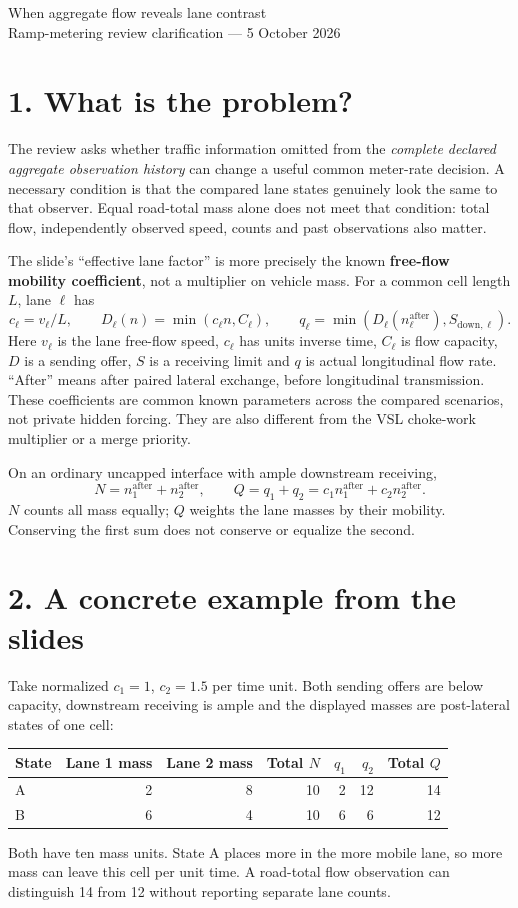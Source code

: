 \documentclass[11pt]{article}
\begin{document}
\begin{center}
{\Large When aggregate flow reveals lane contrast}\\[0.4em]
Ramp-metering review clarification --- 5 October 2026
\end{center}

\section*{1. What is the problem?}
The review asks whether traffic information omitted from the \emph{complete
declared aggregate observation history} can change a useful common meter-rate
decision. A necessary condition is that the compared lane states genuinely look
the same to that observer. Equal road-total mass alone does not meet that condition:
total flow, independently observed speed, counts and past observations also matter.

The slide's ``effective lane factor'' is more precisely the known
\textbf{free-flow mobility coefficient}, not a multiplier on vehicle mass.
For a common cell length \(L\), lane \(\ell\) has
\[
 c_\ell=v_\ell/L,\qquad
 D_\ell(n)=\min(c_\ell n,C_\ell),\qquad
 q_\ell=\min(D_\ell(n_\ell^{\mathrm{after}}),S_{\mathrm{down},\ell}).
\]
Here \(v_\ell\) is the lane free-flow speed, \(c_\ell\) has units inverse time,
\(C_\ell\) is flow capacity, \(D\) is a sending offer, \(S\) is a receiving
limit and \(q\) is actual longitudinal flow rate. ``After'' means after paired
lateral exchange, before longitudinal transmission. These coefficients are
common known parameters across the compared scenarios, not private hidden forcing.
They are also different from the VSL choke-work multiplier or a merge priority.

On an ordinary uncapped interface with ample downstream receiving,
\[
 N=n_1^{\mathrm{after}}+n_2^{\mathrm{after}},\qquad
 Q=q_1+q_2=c_1n_1^{\mathrm{after}}+c_2n_2^{\mathrm{after}}.
\]
\(N\) counts all mass equally; \(Q\) weights the lane masses by their mobility.
Conserving the first sum does not conserve or equalize the second.

\section*{2. A concrete example from the slides}
Take normalized \(c_1=1\), \(c_2=1.5\) per time unit. Both sending offers
are below capacity, downstream receiving is ample and the displayed masses
are post-lateral states of one cell:
\begin{center}
\begin{tabular}{@{}lrrrrrr@{}}
\toprule
State & Lane 1 mass & Lane 2 mass & Total \(N\) & \(q_1\) & \(q_2\) & Total \(Q\)\\
\midrule
A & 2 & 8 & 10 & 2 & 12 & 14\\
B & 6 & 4 & 10 & 6 & 6 & 12\\
\bottomrule
\end{tabular}
\end{center}
Both have ten mass units. State A places more in the more mobile lane, so more
mass can leave this cell per unit time. A road-total flow observation can
distinguish 14 from 12 without reporting separate lane counts.
\end{document}
